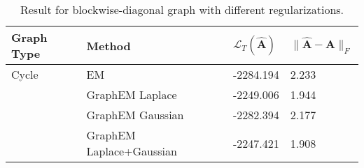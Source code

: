 \begin{table}[tb]
\caption{Result for blockwise-diagonal graph with different regularizations.}
\label{tab: prior results for block-diag}
\begin{tabular}{llll}
\toprule
\textbf{Graph Type} & \textbf{Method} & \textbf{$\mathcal{L}_T(\widehat{\mathbf{A}})$} & \textbf{$\| \widehat{\mathbf{A}} - \mathbf{A} \|_F$} \\
\midrule
Cycle & EM & -2284.194 & 2.233 \\
 & GraphEM Laplace & -2249.006 & 1.944 \\
 & GraphEM Gaussian & -2282.394 & 2.177 \\
 & GraphEM Laplace+Gaussian & -2247.421 & 1.908 \\
\bottomrule
\end{tabular}
\end{table}
